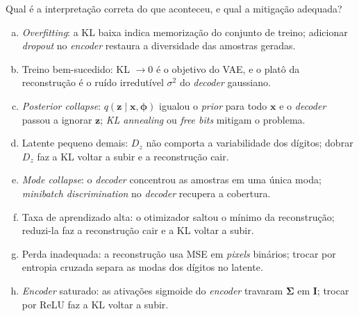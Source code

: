 \documentclass[11pt,a4paper]{article}
\begin{document}
\begin{enumerate}[1)]
Qual é a interpretação correta do que aconteceu, e qual a mitigação adequada?
\begin{enumerate}[a)]
    \item \textit{Overfitting}: a KL baixa indica memorização do conjunto de treino; adicionar \textit{dropout} no \textit{encoder} restaura a diversidade das amostras geradas.
    \item Treino bem-sucedido: KL $\to 0$ é o objetivo do VAE, e o platô da reconstrução é o ruído irredutível $\sigma^{2}$ do \textit{decoder} gaussiano.
    \item \textit{Posterior collapse}: $q(\mathbf{z} \mid \mathbf{x}, \boldsymbol{\phi})$ igualou o \textit{prior} para todo $\mathbf{x}$ e o \textit{decoder} passou a ignorar $\mathbf{z}$; \textit{KL annealing} ou \textit{free bits} mitigam o problema.
    \item Latente pequeno demais: $D_z$ não comporta a variabilidade dos dígitos; dobrar $D_z$ faz a KL voltar a subir e a reconstrução cair.
    \item \textit{Mode collapse}: o \textit{decoder} concentrou as amostras em uma única moda; \textit{minibatch discrimination} no \textit{decoder} recupera a cobertura.
    \item Taxa de aprendizado alta: o otimizador saltou o mínimo da reconstrução; reduzi-la faz a reconstrução cair e a KL voltar a subir.
    \item Perda inadequada: a reconstrução usa MSE em \textit{pixels} binários; trocar por entropia cruzada separa as modas dos dígitos no latente.
    \item \textit{Encoder} saturado: as ativações sigmoide do \textit{encoder} travaram $\boldsymbol{\Sigma}$ em $\mathbf{I}$; trocar por ReLU faz a KL voltar a subir.
\end{enumerate}


\end{enumerate}
\end{document}
